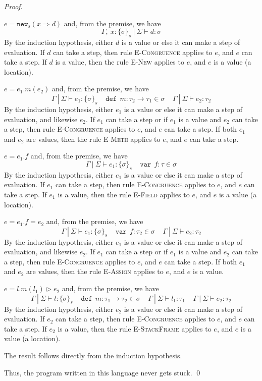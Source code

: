\documentclass{llncs}
\newcommand{\keywadj}[1]{\mathtt{#1}}
\newcommand{\keyw}[1]{\keywadj{#1}~}
\newcommand{\pcase}[1][]{
  \if\relax\detokenize{#1}\relax
    \def\thiscase{}
  \else
    \def\thiscase{~#1}
  \fi
  \item
}
\begin{document}
\begin{proof}
\begin{pcases}
\pcase[\textsc{T-New}]
$e = \keywadj{new}_{s}(x \Rightarrow d)$ and, from the premise, we have
\[
\Gamma,~x : \{ \sigma \}_{s}~|~\Sigma \vdash d : \sigma
\]
By the induction hypothesis, either $d$ is a value or else it can make a step of evaluation. If $d$ can take a step, then rule \textsc{E-Congruence} applies to $e$, and $e$ can take a step. If $d$ is a value, then the rule \textsc{E-New} applies to $e$, and $e$ is a value (a location).
\\
\pcase[\textsc{T-Meth}]
$e = e_1.m(e_2)$ and, from the premise, we have
\[
\Gamma~|~\Sigma \vdash e_1 : \{\sigma\}_s~~~~~\keyw{def}~ m : \tau_2 \rightarrow \tau_1 \in \sigma~~~~~\Gamma~|~\Sigma \vdash e_2 : \tau_2
\]
By the induction hypothesis, either $e_1$ is a value or else it can make a step of evaluation, and likewise $e_2$. If $e_1$ can take a step or if $e_1$ is a value and $e_2$ can take a step, then rule \textsc{E-Congruence} applies to $e$, and $e$ can take a step. If both $e_1$ and $e_2$ are values, then the rule \textsc{E-Meth} applies to $e$, and $e$ can take a step.
\\
\pcase[\textsc{T-Field}]
$e = e_1.f$ and, from the premise, we have
\[
\Gamma~|~\Sigma \vdash e_1 : \{\sigma\}_s~~~~~\keyw{var}~ f : \tau \in \sigma
\]
By the induction hypothesis, either $e_1$ is a value or else it can make a step of evaluation. If $e_1$ can take a step, then rule \textsc{E-Congruence} applies to $e$, and $e$ can take a step. If $e_1$ is a value, then the rule \textsc{E-Field} applies to $e$, and $e$ is a value (a location).
\\
\pcase[\textsc{T-Assign}]
$e = e_1.f=e_2$ and, from the premise, we have
\[
\Gamma~|~\Sigma \vdash e_1 : \{\sigma\}_s~~~~~\keyw{var}~ f:\tau_2 \in \sigma~~~~~\Gamma~|~\Sigma \vdash e_2 : \tau_2
\]
By the induction hypothesis, either $e_1$ is a value or else it can make a step of evaluation, and likewise $e_2$. If $e_1$ can take a step or if $e_1$ is a value and $e_2$ can take a step, then rule \textsc{E-Congruence} applies to $e$, and $e$ can take a step. If both $e_1$ and $e_2$ are values, then the rule \textsc{E-Assign} applies to $e$, and $e$ is a value.
\\
\pcase[\textsc{T-StackFrame}]
$e = l.m(l_1) \rhd e_2$ and, from the premise, we have
\[
\Gamma~|~\Sigma \vdash l : \{\sigma\}_s~~~~~\keyw{def}~ m : \tau_1 \rightarrow \tau_2 \in \sigma~~~~~\Gamma~|~\Sigma \vdash l_1 : \tau_1~~~~~\Gamma~|~\Sigma \vdash e_2 : \tau_2
\]
By the induction hypothesis, either $e_2$ is a value or else it can make a step of evaluation. If $e_2$ can take a step, then rule \textsc{E-Congruence} applies to $e$, and $e$ can take a step. If $e_2$ is a value, then the rule \textsc{E-StackFrame} applies to $e$, and $e$ is a value (a location).
\\
\pcase[\textsc{T-Sub}]
The result follows directly from the induction hypothesis.

\end{pcases}

\noindent Thus, the program written in this language never gets stuck. \qed

\end{proof}
\end{document}
